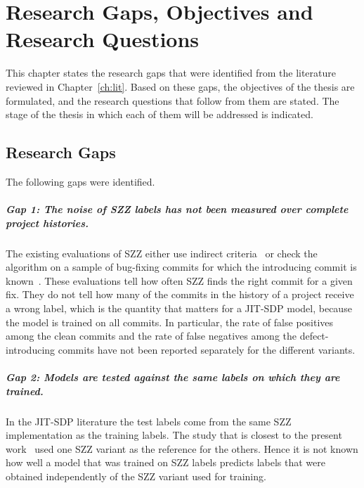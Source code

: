 \documentclass[12pt,a4paper,oneside]{report}
\begin{document}
\chapter{Research Gaps, Objectives and Research Questions}\label{ch:gaps}

This chapter states the research gaps that were identified from the
literature reviewed in Chapter~\ref{ch:lit}. Based on these gaps, the
objectives of the thesis are formulated, and the research questions that
follow from them are stated. The stage of the thesis in which each of them
will be addressed is indicated.

\section{Research Gaps}

The following gaps were identified.

\paragraph{Gap 1: The noise of SZZ labels has not been measured over complete
project histories.} The existing evaluations of SZZ either use indirect
criteria~\cite{dacosta2017maszz} or check the algorithm on a sample of
bug-fixing commits for which the introducing commit is
known~\cite{rosa2021oracle,rodriguez2020bugs}. These evaluations tell how
often SZZ finds the right commit for a given fix. They do not tell how many
of the commits in the history of a project receive a wrong label, which is
the quantity that matters for a JIT-SDP model, because the model is trained on
all commits. In particular, the rate of false positives among the clean
commits and the rate of false negatives among the defect-introducing commits
have not been reported separately for the different variants.

\paragraph{Gap 2: Models are tested against the same labels on which they are
trained.} In the JIT-SDP literature the test labels come from the same SZZ
implementation as the training labels. The study that is closest to the
present work~\cite{fan2021mislabeled} used one SZZ variant as the reference
for the others. Hence it is not known how well a model that was trained on
SZZ labels predicts labels that were obtained independently of the SZZ
variant used for training.
\end{document}

